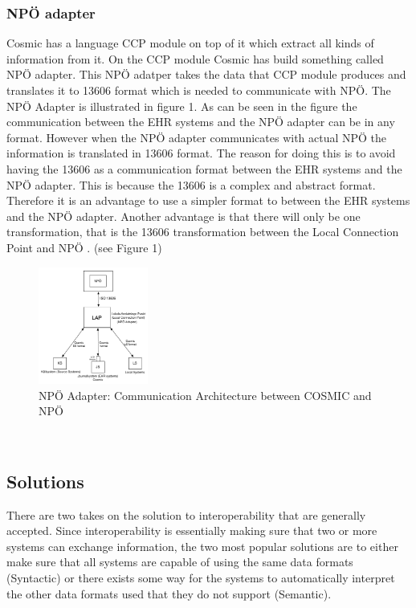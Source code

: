 \documentclass[14pt]{article}
\begin{document}
\subsubsection{NPÖ adapter}
Cosmic has a language CCP module on top of it which extract all kinds of information from it. On the CCP module Cosmic has build something called NPÖ adapter. This NPÖ adatper takes the data that CCP module produces and translates it to 13606 format which is needed to communicate with NPÖ. The NPÖ Adapter is illustrated in figure 1. As can be seen in the figure the communication between the \gls{EHR} systems and the NPÖ adapter can be in any format. However when the NPÖ adapter communicates with actual NPÖ the information is translated in 13606 format. The reason for doing this is to avoid having the 13606 as a communication format between the \gls{EHR} systems and the NPÖ adapter. This is because the 13606 is a complex and abstract format. Therefore it is an advantage to use a simpler format to between the \gls{EHR} systems and the NPÖ adapter. Another advantage is that there will only be one transformation, that is the 13606 transformation between the Local Connection Point and NPÖ  \cite{ViktorJernelov}. (see Figure 1) 

\begin{figure}[h!]
  \caption{NPÖ Adapter: Communication Architecture between COSMIC and NPÖ}
  \centering
    \includegraphics[width=0.32\textwidth]{Images/npoAdapt}
\end{figure}\

\subsection{Solutions}
There are two takes on the solution to interoperability that are generally accepted.  Since interoperability is essentially making sure that two or more systems can exchange information, the two most popular solutions are to either make sure that all systems are capable of using the same data formats (Syntactic) or there exists some way for the systems to automatically interpret the other data formats used that they do not support (Semantic).
\end{document}
